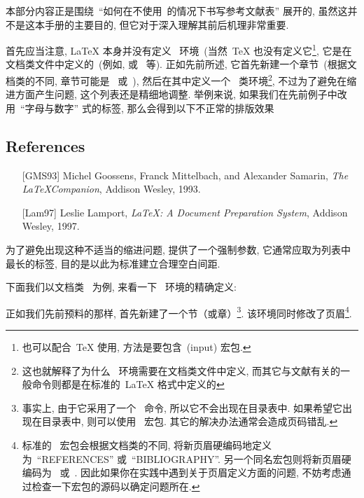 \documentclass{article}
\begin{document}
本部分内容正是围绕~``如何在不使用~\bt 的情况下书写参考文献表'' 展开的, 虽然这并不是这本手册的主要目的, 但它对于深入理解其前后机理非常重要.




首先应当注意, \LaTeX{} 本身并没有定义~ 环境~(当然~\TeX{} 也没有定义它\footnote{%
\bt 也可以配合~\TeX{} 使用, 方法是要包含~(input) 宏包.},
它是在文档类文件中定义的~(例如,  或~ 等).
正如先前所述, 它首先新建一个章节~(根据文档类的不同, 章节可能是~ 或~), 然后在其中定义一个~ 类环境\footnote{%
这也就解释了为什么~ 环境需要在文档类文件中定义, 而其它与文献有关的一般命令则都是在标准的~\LaTeX{} 格式中定义的},
不过为了避免在缩进方面产生问题, 这个列表还是精细地调整. 举例来说, 如果我们在先前例子中改用~``字母与数字'' 式的标签, 那么会得到以下不正常的排版效果
\begin{myex}
\section*{References}
\begin{enumerate}
\renewcommand\labelenumi{[\theenumi]}
\item[{[GMS93]}] Michel Goossens, Franck Mittelbach, and Alexander
Samarin, \emph{The \LaTeX Companion}, Addison Wesley, 1993.
\item[{[Lam97]}] Leslie Lamport, \emph{\LaTeX: A Document Preparation
System}, Addison Wesley, 1997.
\end{enumerate}
\end{myex}

为了避免出现这种不适当的缩进问题,  提供了一个强制参数, 它通常应取为列表中最长的标签, 目的是以此为标准建立合理空白间距.

\medskip
下面我们以文档类~ 为例, 来看一下~ 环境的精确定义:
\begin{listing}{1}
\newenvironment{thebibliography}[1]
     {\section*{\refname
        \@mkboth{\MakeUppercase\refname}{\MakeUppercase\refname}}%
\end{listing}
正如我们先前预料的那样,  首先新建了一个节（或章）\footnote{事实上, 由于它采用了一个~ 命令, 所以它不会出现在目录表中. 如果希望它出现在目录表中, 则可以使用~ 宏包. 其它的解决办法通常会造成页码错乱.}.
该环境同时修改了页眉\footnote{标准的~ 宏包会根据文档类的不同, 将新页眉硬编码地定义为~``REFERENCES'' 或~``BIBLIOGRAPHY''. 另一个同名宏包则将新页眉硬编码为~ 或~. 因此如果你在实践中遇到关于页眉定义方面的问题, 不妨考虑通过检查一下宏包的源码以确定问题所在.}.
\end{document}
